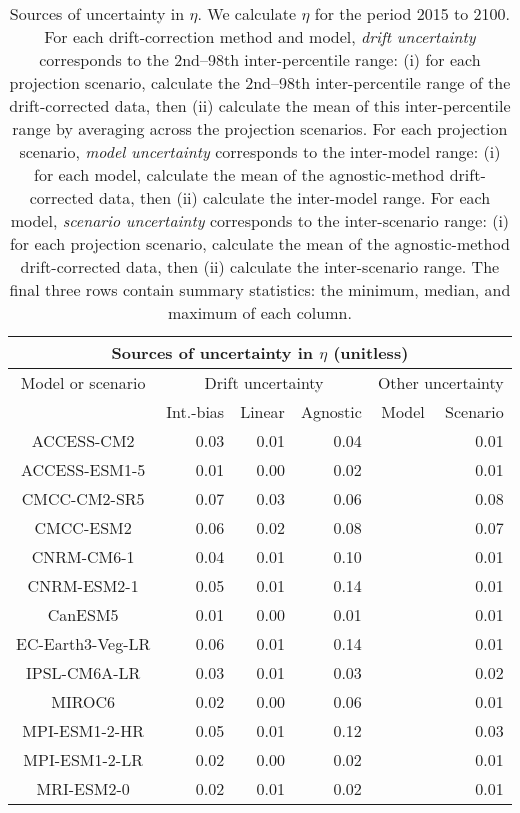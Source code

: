 \begin{table*}[t]
\centering
\caption{Sources of uncertainty in $\eta$. We calculate $\eta$ for the period 2015 to 2100. For each drift-correction method and model, \emph{drift uncertainty} corresponds to the 2nd--98th inter-percentile range: (i) for each projection scenario, calculate the 2nd--98th inter-percentile range of the drift-corrected data, then (ii) calculate the mean of this inter-percentile range by averaging across the projection scenarios. For each projection scenario, \emph{model uncertainty} corresponds to the inter-model range: (i) for each model, calculate the mean of the agnostic-method drift-corrected data, then (ii) calculate the inter-model range. For each model, \emph{scenario uncertainty} corresponds to the inter-scenario range: (i) for each projection scenario, calculate the mean of the agnostic-method drift-corrected data, then (ii) calculate the inter-scenario range. The final three rows contain summary statistics: the minimum, median, and maximum of each column.}
\begin{tabular}{c|rrr|rr}
\toprule
\multicolumn{6}{c}{Sources of uncertainty in $\eta$ (unitless)} \\ 
\midrule
Model or scenario & \multicolumn{3}{c|}{Drift uncertainty} & \multicolumn{2}{c}{Other uncertainty} \\
 & Int.-bias & Linear & Agnostic & Model & Scenario \\
\midrule
ACCESS-CM2 & 0.03 & 0.01 & 0.04 &  & 0.01 \\
ACCESS-ESM1-5 & 0.01 & 0.00 & 0.02 &  & 0.01 \\
CMCC-CM2-SR5 & 0.07 & 0.03 & 0.06 &  & 0.08 \\
CMCC-ESM2 & 0.06 & 0.02 & 0.08 &  & 0.07 \\
CNRM-CM6-1 & 0.04 & 0.01 & 0.10 &  & 0.01 \\
CNRM-ESM2-1 & 0.05 & 0.01 & 0.14 &  & 0.01 \\
CanESM5 & 0.01 & 0.00 & 0.01 &  & 0.01 \\
EC-Earth3-Veg-LR & 0.06 & 0.01 & 0.14 &  & 0.01 \\
IPSL-CM6A-LR & 0.03 & 0.01 & 0.03 &  & 0.02 \\
MIROC6 & 0.02 & 0.00 & 0.06 &  & 0.01 \\
MPI-ESM1-2-HR & 0.05 & 0.01 & 0.12 &  & 0.03 \\
MPI-ESM1-2-LR & 0.02 & 0.00 & 0.02 &  & 0.01 \\
MRI-ESM2-0 & 0.02 & 0.01 & 0.02 &  & 0.01 \\

\end{tabular}
\end{table*}
